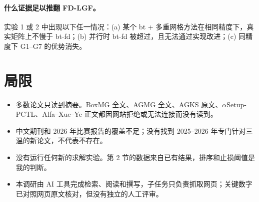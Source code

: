 \documentclass[11pt,a4paper]{ctexart}
\begin{document}
\paragraph{什么证据足以推翻 FD-LGF。}实验 1 或 2 中出现以下任一情况：(a) 某个 bt + 多重网格方法在相同精度下，真实矩阵上不慢于 bt-fd；(b) 并行时 bt-fd 被超过，且无法通过实现改进；(c) 同精度下 G1--G7 的优势消失。

\section{局限}
\begin{itemize}
\item 多数论文只读到摘要。BoxMG 全文、AGMG 全文、AGKS 原文、$\alpha$Setup-PCTL、Alfa--Xue--Ye 正文都因网站拒绝或无法连接而没有读到。
\item 中文期刊和 2026 年比赛报告的覆盖不足；没有找到 2025--2026 年专门针对三温的新论文，不代表不存在。
\item 没有运行任何新的求解实验。第 2 节的数据来自已有结果，排序和止损阈值是我的判断。
\item 本调研由 AI 工具完成检索、阅读和撰写，子任务只负责抓取网页；关键数字已对照网页原文核对，但没有独立的人工评审。
\end{itemize}
\end{document}
